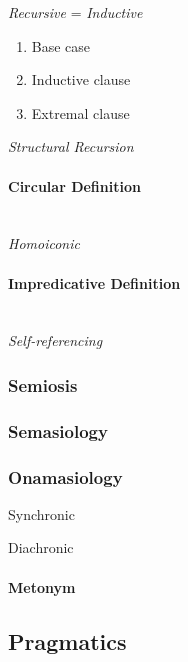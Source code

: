 \emph{Recursive} = \emph{Inductive}

\begin{enumerate}
    \item Base case
    \item Inductive clause
    \item Extremal clause
\end{enumerate}

\emph{Structural Recursion}



\paragraph{Circular Definition}\label{sec:circular_definition}
\hfill \\

\emph{Homoiconic}



\paragraph{Impredicative Definition}\label{sec:impredicative_definition}
\hfill \\

\emph{Self-referencing}



\subsubsection{Semiosis}\label{sec:semiosis}

\subsubsection{Semasiology}\label{sec:semasiology}

\subsubsection{Onamasiology}\label{sec:onamasiology}

Synchronic

Diachronic

\paragraph{Metonym}\label{sec:metonym}



\subsection{Pragmatics}\label{sec:pragmatics}

